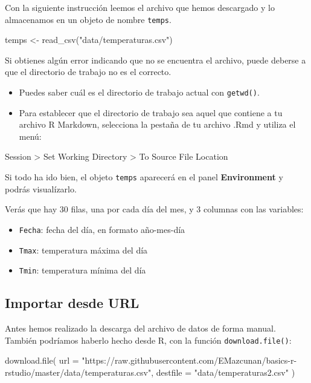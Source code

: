 \documentclass[
  degree=mecinf,
  title=normal,
  toc=normal,
  bib=normal]{mnye}
\providecommand{\tightlist}{%
  \setlength{\itemsep}{0pt}\setlength{\parskip}{0pt}}
\newenvironment{Shaded}{\begin{snugshade}}{\end{snugshade}}
\newcommand{\AttributeTok}[1]{\textcolor[rgb]{0.77,0.63,0.00}{#1}}
\newcommand{\FunctionTok}[1]{\textcolor[rgb]{0.00,0.00,0.00}{#1}}
\newcommand{\NormalTok}[1]{#1}
\newcommand{\OtherTok}[1]{\textcolor[rgb]{0.56,0.35,0.01}{#1}}
\newcommand{\StringTok}[1]{\textcolor[rgb]{0.31,0.60,0.02}{#1}}
\begin{document}
Con la siguiente instrucción leemos el archivo que hemos descargado y lo almacenamos en un objeto de nombre \texttt{temps}.

\begin{Shaded}
\begin{Highlighting}[]
\NormalTok{temps }\OtherTok{\textless{}{-}} \FunctionTok{read\_csv}\NormalTok{(}\StringTok{"data/temperaturas.csv"}\NormalTok{)}
\end{Highlighting}
\end{Shaded}

Si obtienes algún error indicando que no se encuentra el archivo, puede deberse a que el directorio de trabajo no es el correcto.

\begin{itemize}
\item
  Puedes saber cuál es el directorio de trabajo actual con \texttt{getwd()}.
\item
  Para establecer que el directorio de trabajo sea aquel que contiene a tu archivo R Markdown, selecciona la pestaña de tu archivo .Rmd y utiliza el menú:
\end{itemize}

Session \textgreater{} Set Working Directory \textgreater{} To Source File Location

Si todo ha ido bien, el objeto \texttt{temps} aparecerá en el panel \textbf{Environment} y podrás visualízarlo.

Verás que hay \(30\) filas, una por cada día del mes, y \(3\) columnas con las variables:

\begin{itemize}
\tightlist
\item
  \texttt{Fecha}: fecha del día, en formato año-mes-día
\item
  \texttt{Tmax}: temperatura máxima del día
\item
  \texttt{Tmin}: temperatura mínima del día
\end{itemize}

\hypertarget{importar-desde-url}{%
\subsection{Importar desde URL}\label{importar-desde-url}}

Antes hemos realizado la descarga del archivo de datos de forma manual. También podríamos haberlo hecho desde \textsf{R}, con la función \texttt{download.file()}:

\begin{Shaded}
\begin{Highlighting}[]
\FunctionTok{download.file}\NormalTok{(}
    \AttributeTok{url =} \StringTok{"https://raw.githubusercontent.com/EMazcunan/basics{-}r{-}rstudio/master/data/temperaturas.csv"}\NormalTok{,}
    \AttributeTok{destfile =} \StringTok{"data/temperaturas2.csv"}
\NormalTok{)}
\end{Highlighting}
\end{Shaded}
\end{document}
